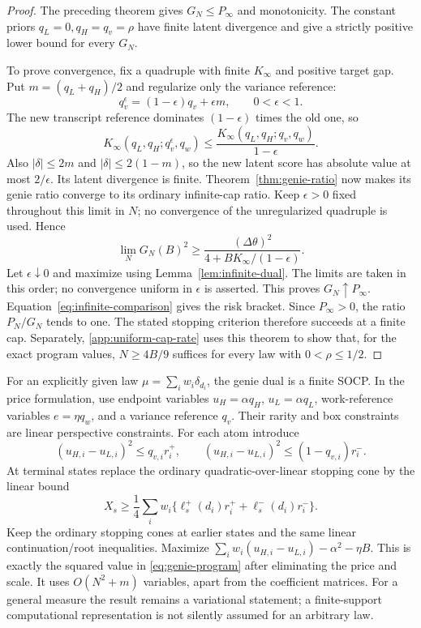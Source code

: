 \begin{proof}
The preceding theorem gives $G_N\le P_\infty$ and monotonicity. The
constant priors $q_L=0,q_H=q_v=\rho$ have finite latent divergence and
give a strictly positive lower bound for every $G_N$.

To prove convergence, fix a quadruple with finite $K_\infty$ and positive
target gap. Put $m=(q_L+q_H)/2$ and regularize only the variance reference:
\[
 q_v^\epsilon=(1-\epsilon)q_v+\epsilon m,
 \qquad 0<\epsilon<1.
\]
The new transcript reference dominates $(1-\epsilon)$ times the old one,
so
\[
 K_\infty(q_L,q_H;q_v^\epsilon,q_w)
 \le\frac{K_\infty(q_L,q_H;q_v,q_w)}{1-\epsilon}.
\]
Also $|\delta|\le2m$ and $|\delta|\le2(1-m)$, so the new latent score
has absolute value at most $2/\epsilon$. Its latent divergence is finite.
Theorem~\ref{thm:genie-ratio} now makes its genie ratio converge to its
ordinary infinite-cap ratio. Keep $\epsilon>0$ fixed throughout
this limit in $N$; no convergence of the unregularized
quadruple is used. Hence
\[
 \lim_NG_N(B)^2\ge
 \frac{(\Delta\theta)^2}{4+B K_\infty/(1-\epsilon)}.
\]
Let $\epsilon\downarrow0$ and maximize using
Lemma~\ref{lem:infinite-dual}. The limits are taken in this order;
no convergence uniform in $\epsilon$ is asserted. This proves
$G_N\uparrow P_\infty$.
Equation~\eqref{eq:infinite-comparison} gives the risk bracket.
Since $P_\infty>0$, the ratio $P_N/G_N$ tends to one. The stated stopping
criterion therefore succeeds at a finite cap. Separately,
\cref{app:uniform-cap-rate} uses this theorem to show that, for the
exact program values, $N\ge4B/9$ suffices for every law with
$0<\rho\le1/2$.
\end{proof}

For an explicitly given law $\mu=\sum_iw_i\delta_{d_i}$, the genie dual
is a finite SOCP. In the price formulation, use endpoint variables
$u_H=\alpha q_H$, $u_L=\alpha q_L$, work-reference variables
$e=\eta q_w$, and a variance reference $q_v$. Their rarity and box
constraints are linear perspective constraints. For each atom introduce
\[
 (u_{H,i}-u_{L,i})^2\le q_{v,i}r_i^+,
 \qquad
 (u_{H,i}-u_{L,i})^2\le(1-q_{v,i})r_i^-.
\]
At terminal states replace the ordinary quadratic-over-linear stopping
cone by the linear bound
\[
 X_s\ge\frac14\sum_iw_i
           \{\ell_s^+(d_i)r_i^++\ell_s^-(d_i)r_i^-\}.
\]
Keep the ordinary stopping cones at earlier states and the same linear
continuation/root inequalities. Maximize
$\sum_iw_i(u_{H,i}-u_{L,i})-\alpha^2-\eta B$.
This is exactly the squared value in \eqref{eq:genie-program} after
eliminating the price and scale. It uses $O(N^2+m)$ variables, apart from
the coefficient matrices. For a general measure the result remains a
variational statement; a finite-support computational representation is
not silently assumed for an arbitrary law.

